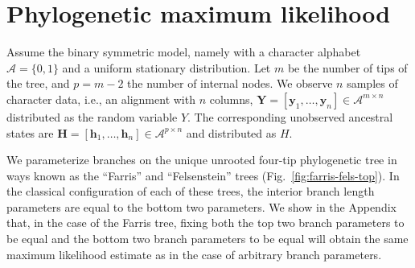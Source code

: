 \documentclass{article}
\newcommand{\alphabet}{\mathcal{A}}
\newcommand{\fullAlignment}{\mathbf{Y}}
\newcommand{\alignmentColumn}{\mathbf{y}}
\newcommand{\alignmentColumnRV}{Y}
\newcommand{\fullAncestralStates}{\mathbf{H}}
\newcommand{\ancestralStateColumn}{\mathbf{h}}
\newcommand{\ancestralStateColumnRV}{H}
\newcommand{\nCols}{n}
\newcommand{\nSiteRows}{m}
\newcommand{\nAncestralStateRows}{p}
\begin{document}
\section*{Phylogenetic maximum likelihood}

Assume the binary symmetric model, namely with a character alphabet $\alphabet=\{0,1\}$ and a uniform stationary distribution.
Let $\nSiteRows$ be the number of tips of the tree, and $\nAncestralStateRows = \nSiteRows-2$ the number of internal nodes.
We observe $\nCols$ samples of character data, i.e., an alignment with $\nCols$ columns, $\fullAlignment=[\alignmentColumn_1,\ldots,\alignmentColumn_\nCols]\in\alphabet^{\nSiteRows\times\nCols}$ distributed as the random variable $\alignmentColumnRV$.
The corresponding unobserved ancestral states are $\fullAncestralStates=[\ancestralStateColumn_1,\ldots,\ancestralStateColumn_\nCols]\in\alphabet^{\nAncestralStateRows\times\nCols}$ and distributed as $\ancestralStateColumnRV$.

We parameterize branches on the unique unrooted four-tip phylogenetic tree in ways known as the ``Farris'' and ``Felsenstein'' trees (Fig.~\ref{fig:farris-fels-top}).
In the classical configuration of each of these trees, the interior branch length parameters are equal to the bottom two parameters.
We show in the Appendix that, in the case of the Farris tree, fixing both the top two branch parameters to be equal and the bottom two branch parameters to be equal will obtain the same maximum likelihood estimate as in the case of arbitrary branch parameters.
\end{document}
